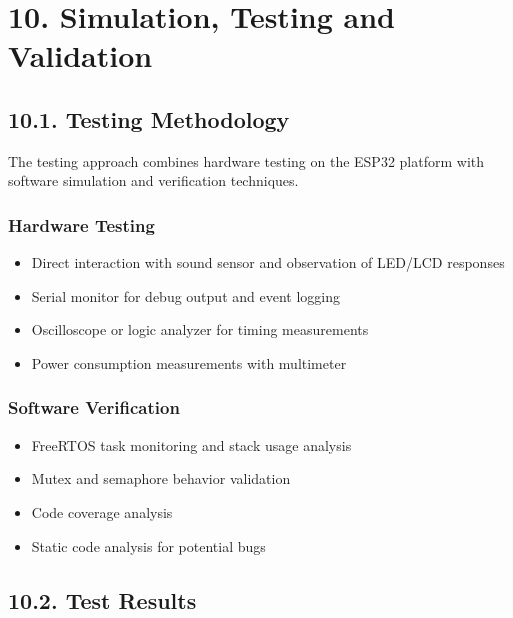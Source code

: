 \documentclass[12pt]{article}
\begin{document}
\section*{10. Simulation, Testing and Validation}

\subsection*{10.1. Testing Methodology}

The testing approach combines hardware testing on the ESP32 platform with software simulation and verification techniques.

\subsubsection*{Hardware Testing}

\begin{itemize}
    \item Direct interaction with sound sensor and observation of LED/LCD responses
    \item Serial monitor for debug output and event logging
    \item Oscilloscope or logic analyzer for timing measurements
    \item Power consumption measurements with multimeter
\end{itemize}

\subsubsection*{Software Verification}

\begin{itemize}
    \item FreeRTOS task monitoring and stack usage analysis
    \item Mutex and semaphore behavior validation
    \item Code coverage analysis
    \item Static code analysis for potential bugs
\end{itemize}

\subsection*{10.2. Test Results}
\end{document}
